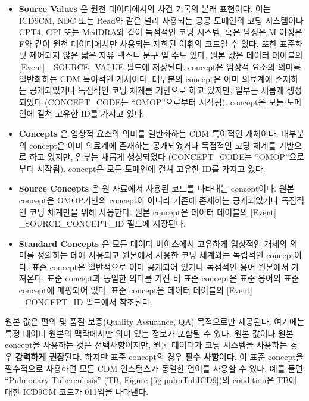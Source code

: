 \documentclass[11pt]{book}
\providecommand{\tightlist}{%
  \setlength{\itemsep}{0pt}\setlength{\parskip}{0pt}}
\theoremstyle{definition}
\theoremstyle{definition}
\theoremstyle{definition}
\theoremstyle{remark}
\begin{document}
\begin{itemize}
\tightlist
\item
  \textbf{Source Values} 은 원천 데이터에서의 사건 기록의 본래 표현이다.
  이는 ICD9CM, NDC 또는 Read와 같은 널리 사용되는 공공 도메인의 코딩
  시스템이나 CPT4, GPI 또는 MedDRA와 같이 독점적인 코딩 시스템, 혹은
  남성은 M 여성은 F와 같이 원천 데이터에서만 사용되는 제한된 어휘의
  코드일 수 있다. 또한 표준화 및 제어되지 않은 짧은 자유 텍스트 문구 일
  수도 있다. 원본 값은 데이터 테이블의 {[}Event{]} \_SOURCE\_VALUE
  필드에 저장된다. concept은 임상적 요소의 의미를 일반화하는 CDM
  특이적인 개체이다. 대부분의 concept은 이미 의료계에 존재하는
  공개되었거나 독점적인 코딩 체계를 기반으로 하고 있지만, 일부는 새롭게
  생성되었다 (CONCEPT\_CODE는 ``OMOP''으로부터 시작됨). concept은 모든
  도메인에 걸쳐 고유한 ID를 가지고 있다.
\item
  \textbf{Concepts} 은 임상적 요소의 의미를 일반화하는 CDM 특이적인
  개체이다. 대부분의 concept은 이미 의료계에 존재하는 공개되었거나
  독점적인 코딩 체계를 기반으로 하고 있지만, 일부는 새롭게 생성되었다
  (CONCEPT\_CODE는 ``OMOP''으로부터 시작됨). concept은 모든 도메인에
  걸쳐 고유한 ID를 가지고 있다.
\item
  \textbf{Source Concepts} 은 원 자료에서 사용된 코드를 나타내는
  concept이다. 원본 concept은 OMOP기반의 concept이 아니라 기존에
  존재하는 공개되었거나 독점적인 코딩 체계만을 위해 사용한다. 원본
  concept은 데이터 테이블의 {[}Event{]} \_SOURCE\_CONCEPT\_ID 필드에
  저장된다.
\item
  \textbf{Standard Concepts} 은 모든 데이터 베이스에서 고유하게 임상적인
  개체의 의미를 정의하는 데에 사용되고 원본에서 사용한 코딩 체계와는
  독립적인 concept이다. 표준 concept은 일반적으로 이미 공개되어 있거나
  독점적인 용어 원본에서 가져온다. 표준 concept과 동일한 의미를 가진 비
  표준 concept은 표준 용어의 표준 concept에 매핑되어 있다. 표준
  concept은 데이터 테이블의 {[}Event{]} \_CONCEPT\_ID 필드에서 참조된다.
\end{itemize}

원본 값은 편의 및 품질 보증(Quality Assurance, QA) 목적으로만 제공된다.
여기에는 특정 데이터 원본의 맥락에서만 의미 있는 정보가 포함될 수 있다.
원본 값이나 원본 concept을 사용하는 것은 선택사항이지만, 원본 데이터가
코딩 시스템을 사용하는 경우 \textbf{강력하게 권장}된다. 하지만 표준
concept의 경우 \textbf{필수 사항}이다. 이 표준 concept을 필수적으로
사용하면 모든 CDM 인스턴스가 동일한 언어를 사용할 수 있다. 예를 들면
``Pulmonary Tuberculosis'' (TB, Figure \ref{fig:pulmTubICD9})의
condition은 TB에 대한 ICD9CM 코드가 011임을 나타낸다.
\end{document}
